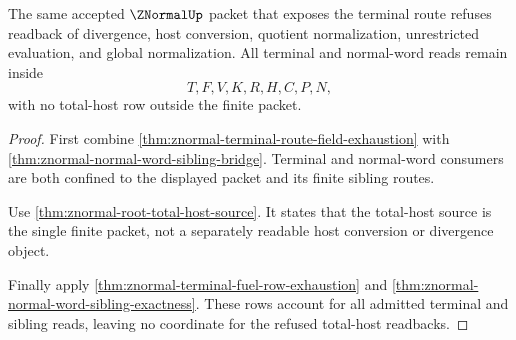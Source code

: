 \begin{theorem}
\label{thm:znormal-total-host-refusal-readback}
The same accepted $\ZNormalUp$ packet that exposes the terminal route refuses
readback of divergence, host conversion, quotient normalization,
unrestricted evaluation, and global normalization. All terminal and
normal-word reads remain inside
$$
T,F,V,K,R,H,C,P,N,
$$
with no total-host row outside the finite packet.
\end{theorem}
\begin{proof}
First combine \autoref{thm:znormal-terminal-route-field-exhaustion} with
\autoref{thm:znormal-normal-word-sibling-bridge}. Terminal and normal-word
consumers are both confined to the displayed packet and its finite sibling
routes.

Use \autoref{thm:znormal-root-total-host-source}. It states that the total-host
source is the single finite packet, not a separately readable host conversion
or divergence object.

Finally apply \autoref{thm:znormal-terminal-fuel-row-exhaustion} and
\autoref{thm:znormal-normal-word-sibling-exactness}. These rows account for
all admitted terminal and sibling reads, leaving no coordinate for the refused
total-host readbacks.
\end{proof}
